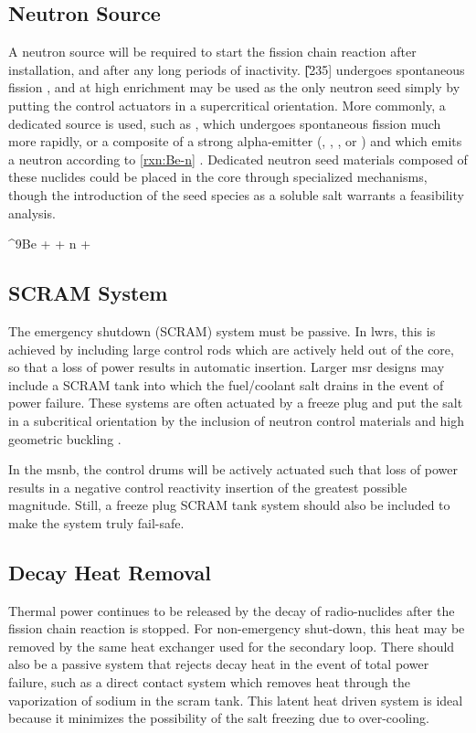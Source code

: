 \subsection{Neutron Source}
A neutron source will be required to start the fission chain reaction after installation, and after any long periods of inactivity. \U[235] undergoes spontaneous fission \cite[Ch. 6]{Faw}, and at high enrichment may be used as the only neutron seed simply by putting the control actuators in a supercritical orientation. More commonly, a dedicated source is used, such as \Ca[252], which undergoes spontaneous fission much more rapidly, or a composite of a strong alpha-emitter (\eg \Pu[238], \Am[241], \Po[210], or \Ra[226]) and \Be[9] which emits a neutron according to \ref{rxn:Be-n} \cite[Ch. 2]{Handbook}. Dedicated neutron seed materials composed of these nuclides could be placed in the core through specialized mechanisms, though the introduction of the seed species as a soluble salt warrants a feasibility analysis.  

\begin{reaction}\label{rxn:Be-n}
    ^{9}Be + \alpha {} + n + \gamma
\end{reaction}

\subsection{SCRAM System}
The emergency shutdown (\ie SCRAM) system must be passive. In \acsp{lwr}, this is achieved by including large control rods which are actively held out of the core, so that a loss of power results in automatic insertion. Larger \acs{msr} designs may include a SCRAM tank into which the fuel/coolant salt drains in the event of power failure. These systems are often actuated by a freeze plug \cite{FreezePlug} and put the salt in a subcritical orientation by the inclusion of neutron control materials \cite[Ch. 1]{Charit} and high geometric buckling \cite[Ch. 6]{Lamarsh}.

In the \acs{msnb}, the control drums will be actively actuated such that loss of power results in a negative control reactivity insertion of the greatest possible magnitude. Still, a freeze plug SCRAM tank system should also be included to make the system truly fail-safe.

\subsection{Decay Heat Removal}
Thermal power continues to be released by the decay of radio-nuclides after the fission chain reaction is stopped. For non-emergency shut-down, this heat may be removed by the same heat exchanger used for the secondary loop. There should also be a passive system that rejects decay heat in the event of total power failure, such as a direct contact system which removes heat through the vaporization of sodium \cite{DecayHeat} in the scram tank. This latent heat driven system is ideal because it minimizes the possibility of the salt freezing due to over-cooling.

